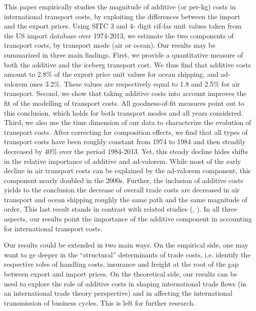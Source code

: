 \documentclass[a4paper,11pt]{article}
\begin{document}
This paper empirically studies the magnitude of additive (or per-kg) costs in international transport costs, by exploiting the differences between the import and the export prices. Using SITC 3 and 4- digit cif-fas unit values taken from the US import database over 1974-2013, we estimate the two components of transport costs, by transport mode (air or ocean).  Our results may be summarized in three main findings. First, we provide a quantitative measure of both the additive and the iceberg transport cost. We thus find that additive costs amount to 2.8\% of the export price unit values for ocean shipping, and ad-valorem ones 3.2\%. These values are respectively equal to 1.8 and 2.5\% for air transport. Second, we show that taking additive costs into account improves the fit of the modelling of transport costs. All goodness-of-fit measures point out to this conclusion, which holds for both transport modes and all years considered. Third, we also use the time dimension of our data to characterize the evolution of transport costs. After correcting for composition effects, we find that all types of transport costs have been roughly constant from 1974 to 1984 and then steadily decreased by 40\% over the period 1984-2013. Yet, this steady decline hides shifts in the relative importance of additive and ad-valorem. While most of the early decline in air transport costs can be explained by the ad-valorem component, this component nearly doubled in the 2000s. Further, the inclusion of additive costs yields to the conclusion the decrease of overall trade costs are decreased in air transport and ocean shipping roughly the same path and the same magnitude of order. This last result stands in contrast with related studies (\citealp{hummels2007}, \citealp{Behar_Venables}). In all three aspects, our results point the importance of the additive component in accounting for international transport costs.

Our results could be extended in two main ways. On the empirical side, one may want to ge deeper in the ``structural'' determinants of trade costs, i.e. identify the respective roles of handling costs, insurance and freight at the root of the gap between export and import prices. On the theoretical side, our results can be used to explore the role of additive costs in shaping international trade flows (in an international trade theory perspective) and in affecting the international transmission of business cycles. This is left for further research.



\newpage


\end{document}
